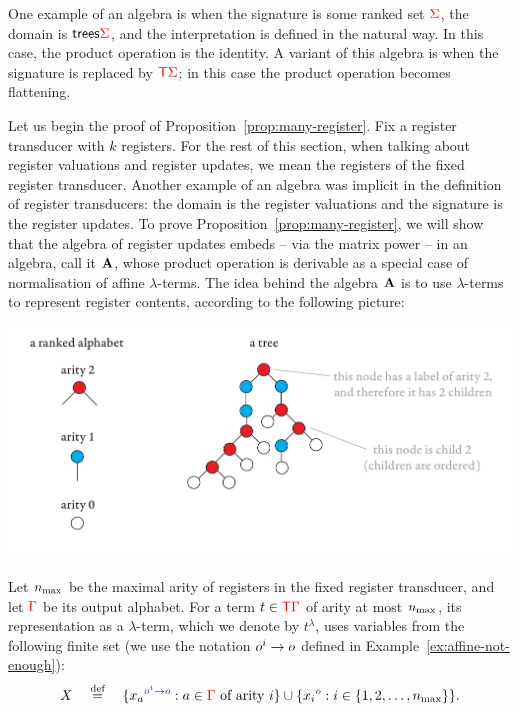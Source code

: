 One example of an algebra is when the signature is some ranked set ${\color{red}{\Sigma}}$, the domain is  $\mathsf {trees} {\color{red}{\Sigma}}$, and the interpretation is defined in the natural way. In this case, the product operation is the identity. A variant of this algebra is when the signature is replaced by ${\color{red}{\mathsf T}} {\color{red}{\Sigma}}$; in this case the product operation becomes flattening. 

Let us begin the proof of Proposition~\ref{prop:many-register}.
Fix a register transducer with $k$ registers. For the rest of this section, when talking about register valuations and register updates, we mean the registers of the fixed register transducer.
Another example of an algebra was implicit in the definition of register transducers: the domain is the register valuations and the signature is the  register updates. To prove  Proposition~\ref{prop:many-register}, we will show that the algebra of register updates embeds -- via the matrix power -- in an algebra, call it ${\color{black}\mathbf A}$, whose product operation is derivable as a special case of normalisation of affine $\lambda$-terms. 
 The idea behind the algebra  ${\color{black}\mathbf A}$ is to use  $\lambda$-terms to represent register contents, according to the following picture:
 \begin{center}
 \includegraphics[scale=.3, page=59]{pics.pdf}
 \end{center}
    Let  $n_{\mathrm{max}}$  be the maximal arity of registers in the fixed register transducer, and let  ${\color{red}{\Gamma}}$ be its  output alphabet. For a term $t \in {\color{red}{\mathsf T}} {\color{red}{\Gamma}}$ of arity at most $n_{\mathrm{max}}$, its representation as a  $\lambda$-term, which we denote by $t^\lambda$,  uses variables from the following finite set (we use the notation $o^i \to o$ defined in Example~\ref{ex:affine-not-enough}):
\begin{align*}
X  \quad \stackrel{\text{def}}= \quad \{{x_a}^{\color{blue}{o^i \to o}} : a \in {\color{red}{\Gamma}} \text{ of arity $i$}\} \cup \{{x_i}^{\color{blue}{o}} : i \in \{1,2,\ldots,n_{\mathrm{max}} \}\}.
\end{align*}
